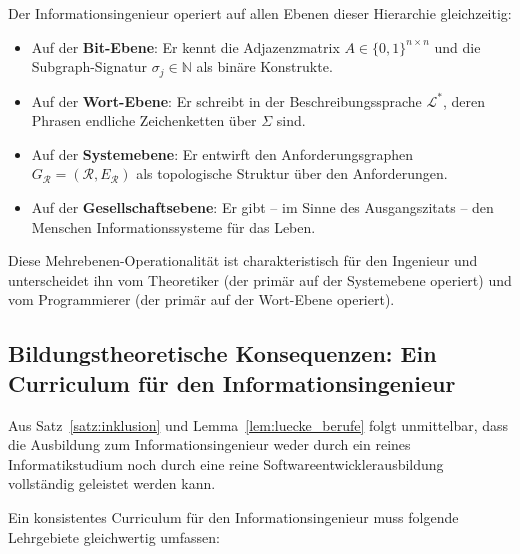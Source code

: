 ﻿\documentclass[a4paper,12pt]{article}
\theoremstyle{definition}
\begin{document}
Der Informationsingenieur operiert auf allen Ebenen dieser Hierarchie gleichzeitig:

\begin{itemize}
  \item Auf der \textbf{Bit-Ebene}: Er kennt die Adjazenzmatrix $A \in \{0,1\}^{n \times n}$
        und die Subgraph-Signatur $\sigma_j \in \mathbb{N}$ als binäre Konstrukte.
  \item Auf der \textbf{Wort-Ebene}: Er schreibt in der Beschreibungssprache $\mathcal{L}^*$,
        deren Phrasen endliche Zeichenketten über $\Sigma$ sind.
  \item Auf der \textbf{Systemebene}: Er entwirft den Anforderungsgraphen
        $G_\mathcal{R} = (\mathcal{R}, E_\mathcal{R})$ als topologische Struktur
        über den Anforderungen.
  \item Auf der \textbf{Gesellschaftsebene}: Er gibt -- im Sinne des Ausgangszitats --
        den Menschen Informationssysteme für das Leben.
\end{itemize}

Diese Mehrebenen-Operationalität ist charakteristisch für den Ingenieur und unterscheidet
ihn vom Theoretiker (der primär auf der Systemebene operiert) und vom Programmierer
(der primär auf der Wort-Ebene operiert).

\subsection{Bildungstheoretische Konsequenzen: Ein Curriculum für den Informationsingenieur}

Aus Satz~\ref{satz:inklusion} und Lemma~\ref{lem:luecke_berufe} folgt unmittelbar, dass
die Ausbildung zum Informationsingenieur weder durch ein reines Informatikstudium noch
durch eine reine Softwareentwicklerausbildung vollständig geleistet werden kann.

Ein konsistentes Curriculum für den Informationsingenieur muss folgende Lehrgebiete
gleichwertig umfassen:
\end{document}
